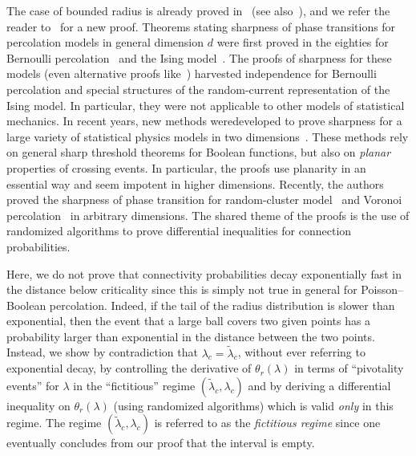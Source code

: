 \documentclass[AHL,Unicode,longabstracts]{cedram}
\begin{document}
The case of bounded radius is already proved in~\cite{meester1994nonuniversality,zuev1985continuous} (see also~\cite{MeeRoy08}), and we refer the reader to~\cite{Zie16} for a new proof. Theorems stating sharpness of phase transitions for percolation models in general dimension $d$ were first proved in the eighties for Bernoulli percolation~\cite{AizBar87,Men86} and the Ising model~\cite{AizBarFer87}. The proofs of sharpness for these models (even alternative proofs like~\cite{DumTas15}) harvested independence for Bernoulli percolation and special structures of the random-current representation of the Ising model. In particular, they were not applicable to other models of statistical mechanics. In recent years, new methods were\linebreak developed to prove sharpness for a large variety of statistical physics models in two dimensions~\cite{ahlberg2016sharpness,BefDum12,BolRio06}. These methods rely on general sharp threshold theorems for Boolean functions, but also on \emph{planar} properties of crossing events. In particular, the proofs use planarity in an essential way and seem impotent in higher dimensions. Recently, the authors proved the sharpness of phase transition for random-cluster model~\cite{DumRaoTas16a} and Voronoi percolation~\cite{DumRaoTas16b} in arbitrary dimensions. The shared theme of the proofs is the use of randomized algorithms to prove differential inequalities for connection probabilities.

Here, we do not prove that connectivity probabilities decay exponentially fast in the distance below criticality since this is simply not true in general for Poisson--Boolean percolation. Indeed, if the tail of the radius distribution is slower than exponential, then the event that a large ball covers two given points has a probability larger than exponential in the distance between the two points. Instead, we show by contradiction that $\lambda_c=\widetilde\lambda_c$, without ever referring to exponential decay, by controlling the derivative of $\theta_r(\lambda)$ in terms of ``pivotality events'' for $ \lambda$ in the ``fictitious'' regime $(\widetilde \lambda_c,\lambda_c)$ and by deriving a differential inequality on $\theta_r(\lambda)$ (using randomized algorithms) which is valid \emph{only} in this regime. The regime $(\widetilde \lambda_c,\lambda_c)$ is referred to as the \emph{fictitious regime} since one eventually concludes from our proof that the interval is empty.
\end{document}
